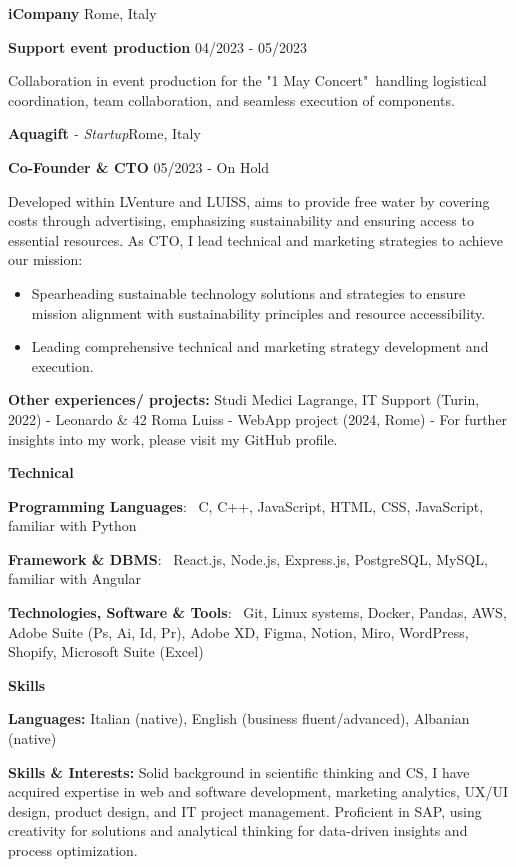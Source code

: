 \documentclass[11pt]{article}
\begin{document}
\vspace{12pt}

\textbf{iCompany} \hfill Rome, Italy

\textbf{Support event production} \hfill 04/2023 - 05/2023

Collaboration in event production for the "1 May Concert"\ handling logistical coordination, team collaboration, and seamless execution of components.
\vspace{12pt}

\textbf{Aquagift} \textit{- Startup}\hfill Rome, Italy

\textbf{Co-Founder \& CTO} \hfill 05/2023 - On Hold

Developed within LVenture and LUISS, aims to provide free water by covering costs through advertising, emphasizing sustainability and ensuring access to essential resources. As CTO, I lead technical and marketing strategies to achieve our mission:



\begin{itemize}[noitemsep,topsep=0pt]
    \item Spearheading sustainable technology solutions and strategies to ensure mission alignment with sustainability principles and resource accessibility.
    \item Leading comprehensive technical and marketing strategy development and execution.

\end{itemize}
\textbf{Other experiences/ projects:} Studi Medici Lagrange, IT Support (Turin, 2022) - Leonardo \& 42 Roma Luiss - WebApp project (2024, Rome)  - For further insights into my work, please visit my GitHub profile.\hfill

\begin{center}
    \textbf{Technical}
\end{center}

\textbf{Programming Languages}: \
C, C++, JavaScript, HTML, CSS, JavaScript, familiar with Python

\textbf{Framework \& DBMS}: \
React.js, Node.js, Express.js, PostgreSQL, MySQL, familiar with Angular

\textbf{Technologies, Software \& Tools}: \
Git, Linux systems, Docker, Pandas, AWS, Adobe Suite (Ps, Ai, Id, Pr), Adobe XD, Figma, Notion, Miro, WordPress, Shopify, Microsoft Suite (Excel)


\vspace{12pt}

\begin{center}
    \textbf{Skills}
\end{center}
\textbf{Languages:} Italian (native), English (business fluent/advanced), Albanian (native)

\textbf{Skills \& Interests:} Solid background in scientific thinking and CS, I have acquired expertise in web and software development, marketing analytics, UX/UI design, product design, and IT project management. Proficient in SAP, using creativity for solutions and analytical thinking for data-driven insights and process optimization.
\end{document}
